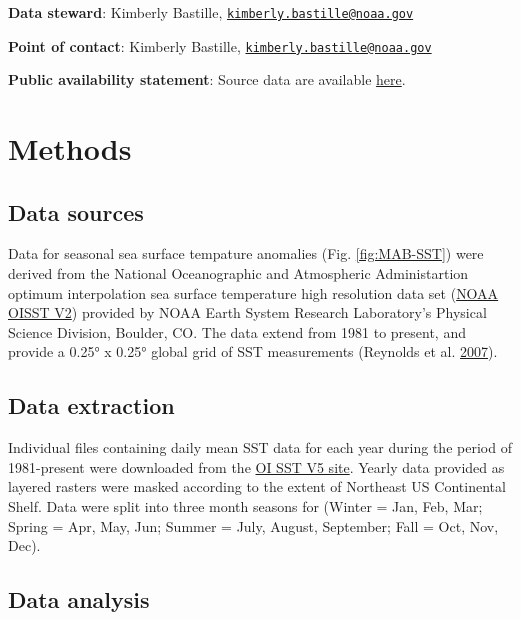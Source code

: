 \documentclass[
]{book}
\begin{document}
\textbf{Data steward}: Kimberly Bastille, \href{mailto:kimberly.bastille@noaa.gov}{\nolinkurl{kimberly.bastille@noaa.gov}}

\textbf{Point of contact}: Kimberly Bastille, \href{mailto:kimberly.bastille@noaa.gov}{\nolinkurl{kimberly.bastille@noaa.gov}}

\textbf{Public availability statement}: Source data are available \href{https://www.esrl.noaa.gov/psd/data/gridded/data.noaa.oisst.v2.highres.html}{here}.

\hypertarget{methods-35}{%
\section{Methods}\label{methods-35}}

\hypertarget{data-sources-35}{%
\subsection{Data sources}\label{data-sources-35}}

Data for seasonal sea surface tempature anomalies (Fig. \ref{fig:MAB-SST}) were derived from the National Oceanographic and Atmospheric Administartion optimum interpolation sea surface temperature high resolution data set (\href{https://www.esrl.noaa.gov/psd/data/gridded/data.noaa.oisst.v2.highres.html}{NOAA OISST V2}) provided by NOAA Earth System Research Laboratory's Physical Science Division, Boulder, CO. The data extend from 1981 to present, and provide a 0.25° x 0.25° global grid of SST measurements (Reynolds et al. \protect\hyperlink{ref-Reynolds2007}{2007}).

\hypertarget{data-extraction-28}{%
\subsection{Data extraction}\label{data-extraction-28}}

Individual files containing daily mean SST data for each year during the period of 1981-present were downloaded from the \href{https://www.esrl.noaa.gov/psd/data/gridded/data.noaa.oisst.v2.highres.html}{OI SST V5 site}. Yearly data provided as layered rasters were masked according to the extent of Northeast US Continental Shelf. Data were split into three month seasons for (Winter = Jan, Feb, Mar; Spring = Apr, May, Jun; Summer = July, August, September; Fall = Oct, Nov, Dec).

\hypertarget{data-analysis-33}{%
\subsection{Data analysis}\label{data-analysis-33}}
\end{document}
